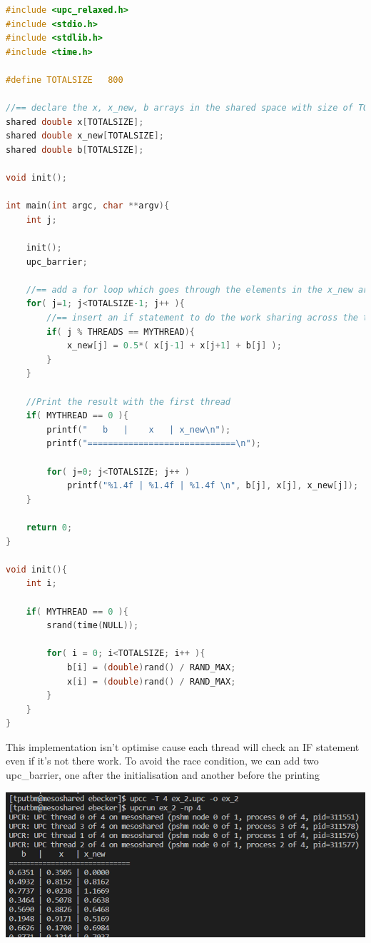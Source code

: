 \documentclass{report}
\begin{document}
\begin{lstlisting}[language=C]
#include <upc_relaxed.h>
#include <stdio.h>
#include <stdlib.h>
#include <time.h>

#define TOTALSIZE 	800

//== declare the x, x_new, b arrays in the shared space with size of TOTALSIZE
shared double x[TOTALSIZE];
shared double x_new[TOTALSIZE];
shared double b[TOTALSIZE];

void init();

int main(int argc, char **argv){
    int j;

    init();
    upc_barrier;

    //== add a for loop which goes through the elements in the x_new array
    for( j=1; j<TOTALSIZE-1; j++ ){
        //== insert an if statement to do the work sharing across the threads
        if( j % THREADS == MYTHREAD){
            x_new[j] = 0.5*( x[j-1] + x[j+1] + b[j] );
        }
    }

    //Print the result with the first thread
    if( MYTHREAD == 0 ){
        printf("   b   |    x   | x_new\n");
        printf("=============================\n");

        for( j=0; j<TOTALSIZE; j++ )
            printf("%1.4f | %1.4f | %1.4f \n", b[j], x[j], x_new[j]);
    }

    return 0;
}

void init(){
    int i;

    if( MYTHREAD == 0 ){
        srand(time(NULL));

        for( i = 0; i<TOTALSIZE; i++ ){
            b[i] = (double)rand() / RAND_MAX;
            x[i] = (double)rand() / RAND_MAX;
        }
    }
}

\end{lstlisting}

This implementation isn't optimise cause each thread will check an IF statement even if it's not there work. To avoid the race condition, we can add two upc\_barrier, one after the initialisation and another before the printing

\begin{center}
    \includegraphics[scale=0.75]{Images/1rst_output.png}
    \label{fig3}
\end{center}
\end{document}
